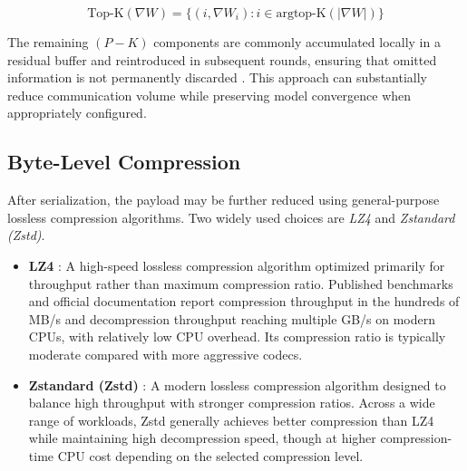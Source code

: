 \begin{equation}
    \text{Top-K}(\nabla W) = \{(i, \nabla W_i) : i \in \text{argtop-K}(|\nabla W|)\}
    \label{eq:topk}
\end{equation}

The remaining $(P - K)$ components are commonly accumulated locally in a residual
buffer and reintroduced in subsequent rounds, ensuring that omitted information 
is not permanently discarded \cite{lin2018deep_gradient, karimireddy2019errorfeedback, 
stich2018sparsified}. This approach can substantially reduce communication volume 
while preserving model convergence when appropriately configured.

\subsection{Byte-Level Compression}
\label{subsec:compression_byte}

After serialization, the payload may be further reduced using general-purpose
lossless compression algorithms. Two widely used choices are \emph{LZ4} and
\emph{Zstandard (Zstd)}.

\begin{itemize}
    \item \textbf{LZ4} \cite{lz4_reference, collet2011lz4}: A high-speed lossless
    compression algorithm optimized primarily for throughput rather than maximum
    compression ratio. Published benchmarks and official documentation report
    compression throughput in the hundreds of MB/s and decompression throughput
    reaching multiple GB/s on modern CPUs, with relatively low CPU overhead.
    Its compression ratio is typically moderate compared with more aggressive codecs.

    \item \textbf{Zstandard (Zstd)} \cite{collet2018zstandard}: A modern lossless
    compression algorithm designed to balance high throughput with stronger
    compression ratios. Across a wide range of workloads, Zstd generally achieves
    better compression than LZ4 while maintaining high decompression speed, though
    at higher compression-time CPU cost depending on the selected compression level.
\end{itemize}

